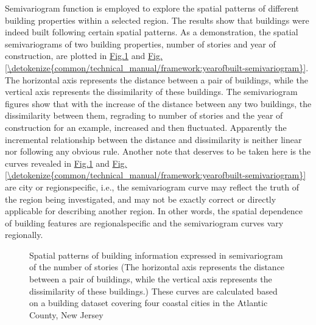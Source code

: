 \documentclass[letterpaper,10pt,english]{sphinxmanual}
\begin{document}
\sphinxAtStartPar
Semivariogram function is employed to explore the spatial patterns of
different building properties within a selected region.
The results show that buildings were indeed built following certain spatial patterns.
As a demonstration, the spatial semivariograms of two building properties,
number of stories and year of construction, are plotted in \hyperref[\detokenize{common/technical_manual/framework:numofstories-semivariogram}]{Fig.\@ \ref{\detokenize{common/technical_manual/framework:numofstories-semivariogram}}}
and \hyperref[\detokenize{common/technical_manual/framework:yearofbuilt-semivariogram}]{Fig.\@ \ref{\detokenize{common/technical_manual/framework:yearofbuilt-semivariogram}}}.
The horizontal axis represents the distance between a pair of buildings, while the vertical axis represents the dis\sphinxhyphen{}similarity of these buildings.
The semivariogram figures show that with the increase of the distance between any two buildings, the dis\sphinxhyphen{}similarity between them,
regrading to number of stories and the year of construction for an example, increased and then fluctuated. Apparently the incremental
relationship between the distance and dis\sphinxhyphen{}similarity is neither linear nor following any obvious rule.
Another note that deserves to be taken here is the curves revealed in \hyperref[\detokenize{common/technical_manual/framework:numofstories-semivariogram}]{Fig.\@ \ref{\detokenize{common/technical_manual/framework:numofstories-semivariogram}}} and \hyperref[\detokenize{common/technical_manual/framework:yearofbuilt-semivariogram}]{Fig.\@ \ref{\detokenize{common/technical_manual/framework:yearofbuilt-semivariogram}}}
are city\sphinxhyphen{} or region\sphinxhyphen{}specific, i.e., the semivariogram curve may reflect the truth of the region being investigated, and may not be exactly
correct or directly applicable for describing another region.
In other words, the spatial dependence of building features are regional\sphinxhyphen{}specific and the semivariogram curves vary regionally.

\begin{figure}[htbp]
\centering
\capstart

\noindent{}
\caption{Spatial patterns of building information expressed in semivariogram of the number of stories (The horizontal axis represents the distance between a pair of buildings, while the vertical axis represents the dis\sphinxhyphen{}similarity of these buildings.) These curves are calculated based on a building dataset covering four coastal cities in the Atlantic County, New Jersey}\label{\detokenize{common/technical_manual/framework:id15}}\label{\detokenize{common/technical_manual/framework:numofstories-semivariogram}}\end{figure}
\end{document}
